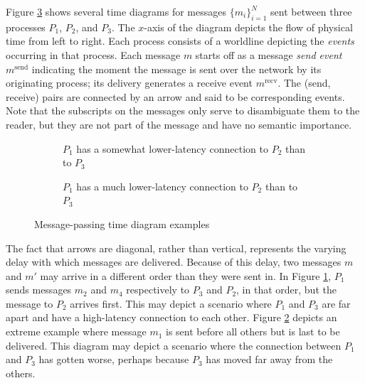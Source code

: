 \documentclass[]             %
{NASA}                       %
\theoremstyle{definition}
\begin{document}
Figure \ref{fig:message-latencies} shows several time diagrams for
messages $\{m_i\}_{i=1}^N$ sent between three processes $P_1$, $P_2$,
and $P_3$. The $x$-axis of the diagram depicts the flow of physical
time from left to right. Each process consists of a worldline
depicting the \emph{events} occurring in that process. Each message
$m$ starts off as a message \emph{send event} $m^\textrm{send}$
indicating the moment the message is sent over the network by its
originating process; its delivery generates a receive event
$m^\textrm{recv}$. The (send, receive) pairs are connected by an arrow
and said to be corresponding events. Note that the subscripts on the
messages only serve to disambiguate them to the reader, but they are
not part of the message and have no semantic importance.

\begin{figure}[p]
  \setlength\belowcaptionskip{5ex}

  \begin{subfigure}{1\textwidth}
    \centering
    
    \caption{$P_1$ has a somewhat lower-latency connection to $P_2$ than to $P_3$}
    \label{fig:message-latencies-a}
  \end{subfigure}

  \begin{subfigure}{1\textwidth}
    \centering 
    \caption{$P_1$ has a much lower-latency connection to $P_2$ than to $P_3$}
    \label{fig:message-latencies-b}
  \end{subfigure}
  \caption{Message-passing time diagram examples}
  \label{fig:message-latencies}
\end{figure}

\afterpage{\clearpage}

The fact that arrows are diagonal, rather than vertical, represents
the varying delay with which messages are delivered. Because of this
delay, two messages $m$ and $m'$ may arrive in a different order than
they were sent in. In Figure \ref{fig:message-latencies-a}, $P_1$
sends messages $m_2$ and $m_4$ respectively to $P_3$ and $P_2$, in
that order, but the message to $P_2$ arrives first. This may depict a
scenario where $P_1$ and $P_3$ are far apart and have a high-latency
connection to each other. Figure \ref{fig:message-latencies-b} depicts
an extreme example where message $m_1$ is sent before all others but
is last to be delivered. This diagram may depict a scenario where the
connection between $P_1$ and $P_3$ has gotten worse, perhaps because
$P_3$ has moved far away from the others.
\end{document}

